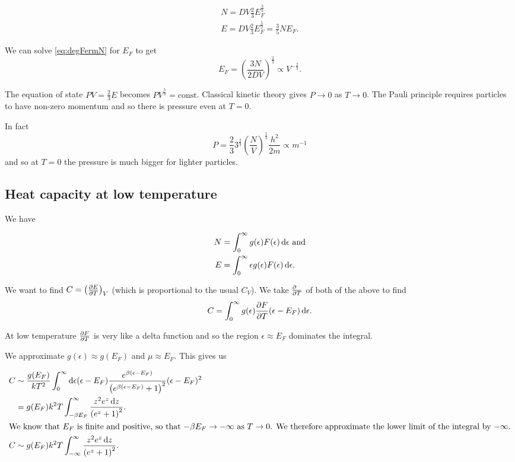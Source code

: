\documentclass{notes}
\newcommand{\pdf}[3]{\left(\pd{#1}{#2}\right)_{#3}}
\begin{document}
\begin{gather}
N = D V \tfrac{2}{3} E_F^{\frac{3}{2}}\label{eq:degFermN} \\
E = D V \tfrac{2}{3} E_F^{\frac{5}{2}} = \tfrac{3}{5} N E_F.
\end{gather}

We can solve \eqref{eq:degFermN} for $E_F$ to get
\[
E_F = \left( \frac{3 N}{2 D V} \right)^{\frac{2}{3}} \propto
V^{-\frac{2}{3}}.
\]

The equation of state $P V = \tfrac{2}{3} E$ becomes $P
V^{\frac{5}{3}} = \text{const}$.  Classical kinetic theory gives $P
\to 0$ as $T \to 0$.  The Pauli principle requires particles to have
non-zero momentum and so there is pressure even at $T = 0$.

In fact
\[
P = \frac{2}{3} 3^{\frac{2}{3}} \left( \frac{N}{V} \right)^{\frac{5}{3}}
\frac{h^2}{2 m} \propto m^{-1}
\]
and so at $T =0$ the pressure is much bigger for lighter particles.

\subsection{Heat capacity at low temperature}

We have

\begin{align*}
N &= \int_0^\infty g(\epsilon) F(\epsilon)\, \mathrm{d} \epsilon \text{ and} \\
E &= \int_0^\infty \epsilon g(\epsilon) F(\epsilon)\, \mathrm{d} \epsilon.
\end{align*}

We want to find $C = \pdf{E}{T}{V}$ (which is proportional to
the usual $C_V$).  We take $\frac{\partial \phantom{T}}{\partial T}$ of both of the above
to find
\[
C = \int_0^\infty g(\epsilon) \frac{\partial F}{\partial T} (\epsilon - E_F)\, \mathrm{d} \epsilon.
\]

At low temperature $\frac{\partial F}{\partial T}$ is very like a delta function and so
the region $\epsilon \approx E_F$ dominates the integral.

We approximate $g(\epsilon) \approx g(E_F)$ and
$\mu \approx E_F$.  This gives us

\begin{align*}
C &\sim \frac{g(E_F)}{k T^2} \int_0^\infty\mathrm{d} \epsilon (\epsilon - E_F)
\frac{e^{\beta(\epsilon - E_F)}}{\left(
e^{\beta(\epsilon - E_F)} + 1 \right)^2} (\epsilon - E_F)^2 \\
&= g(E_F) k^2 T \int_{-\beta E_F}^\infty \frac{z^2 e^z\, \mathrm{d} z}{\left(
e^z + 1\right)^2}. \\
\intertext{We know that $E_F$ is finite and positive, so that
$-\beta E_F \to - \infty$ as $T \to 0$.  We therefore approximate
the lower limit of the integral by $-\infty$.}
C &\sim g(E_F) k^2 T \int_{-\infty}^\infty \frac{z^2 e^z\, \mathrm{d} z}{\left(
e^z + 1\right)^2}.
\end{align*}
\end{document}
